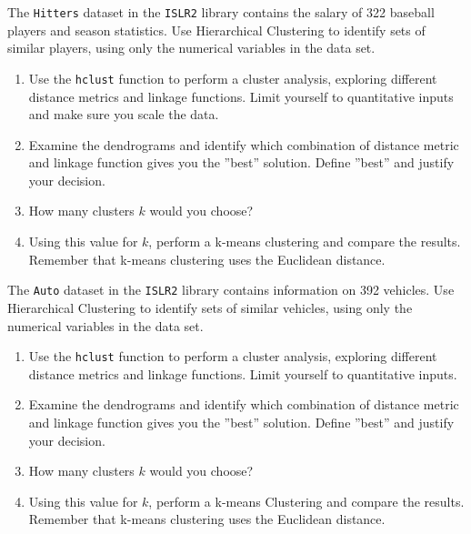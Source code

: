 \begin{exercisebox}

The \texttt{Hitters} dataset in the \texttt{ISLR2} library contains the salary of 322 baseball players and season statistics. Use Hierarchical Clustering to identify sets of similar players, using only the numerical variables in the data set.

\begin{enumerate}
   \item Use the \texttt{hclust} function to perform a cluster analysis, exploring different distance metrics and linkage functions. Limit yourself to quantitative inputs and make sure you scale the data.
   \item Examine the dendrograms and identify which combination of distance metric and linkage function gives you the ''best'' solution. Define ''best'' and justify your decision.
   \item How many clusters $k$ would you choose?
   \item Using this value for $k$, perform a k-means clustering and compare the results. Remember that k-means clustering uses the Euclidean distance.
\end{enumerate}
\end{exercisebox}

\begin{exercisebox}

The \texttt{Auto} dataset in the \texttt{ISLR2} library contains information on 392 vehicles. Use Hierarchical Clustering to identify sets of similar vehicles, using only the numerical variables in the data set.

\begin{enumerate}
   \item Use the \texttt{hclust} function to perform a cluster analysis, exploring different distance metrics and linkage functions. Limit yourself to quantitative inputs.
   \item Examine the dendrograms and identify which combination of distance metric and linkage function gives you the ''best'' solution. Define ''best'' and justify your decision.
   \item How many clusters $k$ would you choose?
   \item Using this value for $k$, perform a k-means Clustering and compare the results. Remember that k-means clustering uses the Euclidean distance.
\end{enumerate}
\end{exercisebox}

